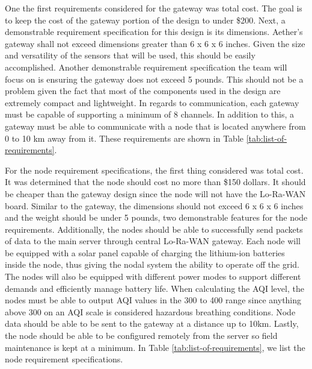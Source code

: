 One the first requirements considered for the gateway was total cost. The goal is to keep the cost of the gateway portion of the design to under \$200. Next, a demonstrable requirement specification for this design is its dimensions. Aether’s gateway shall not exceed dimensions greater than 6 x 6 x 6 inches. Given the size and versatility of the sensors that will be used, this should be easily accomplished. Another demonstrable requirement specification the team will focus on is ensuring the gateway does not exceed 5 pounds. This should not be a problem given the fact that most of the components used in the design are extremely compact and lightweight. In regards to communication, each gateway must be capable of supporting a minimum of 8 channels. In addition to this, a gateway must be able to communicate with a node that is located anywhere from 0 to 10 km away from it. These requirements are shown in Table \ref{tab:list-of-requirements}.

For the node requirement specifications, the first thing considered was total cost. It was determined that the node should cost no more than \$150 dollars. It should be cheaper than the gateway design since the node will not have the Lo-Ra-WAN board. Similar to the gateway, the dimensions should not exceed 6 x 6 x 6 inches and the weight should be under 5 pounds, two demonstrable features for the node requirements. Additionally, the nodes should be able to successfully send packets of data to the main server through central Lo-Ra-WAN gateway. Each node will be equipped with a solar panel capable of charging the lithium-ion batteries inside the node, thus giving the nodal system the ability to operate off the grid. The nodes will also be equipped with different power modes to support different demands and efficiently manage battery life. When calculating the AQI level, the nodes must be able to output AQI values in the 300 to 400 range since anything above 300 on an AQI scale is considered hazardous breathing conditions. Node data should be able to be sent to the gateway at a distance up to 10km. Lastly, the node should be able to be configured remotely from the server so field maintenance is kept at a minimum. In Table \ref{tab:list-of-requirements}, we list the node requirement specifications.  


